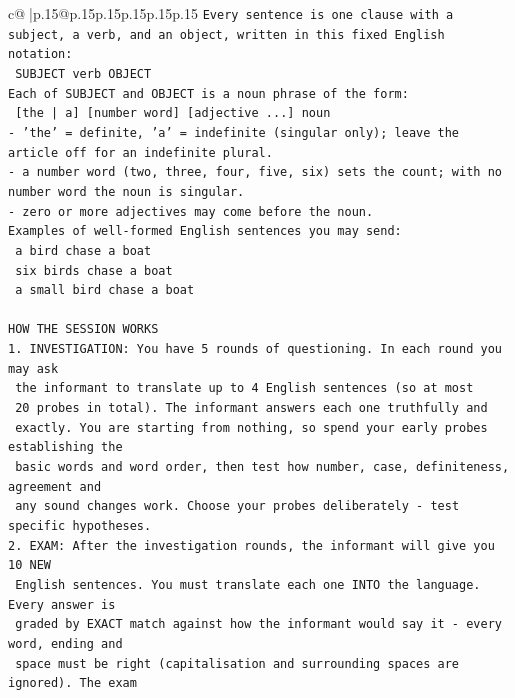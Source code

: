 \documentclass{article}
\begin{document}
{\begin{supertabular}{c@{$\;$}|p{.15\linewidth}@{}p{.15\linewidth}p{.15\linewidth}p{.15\linewidth}p{.15\linewidth}p{.15\linewidth}}
{{{\texttt{Every sentence is one clause with a subject, a verb, and an object, written in this fixed English notation:} \\
\texttt{    SUBJECT  verb  OBJECT} \\
\texttt{Each of SUBJECT and OBJECT is a noun phrase of the form:} \\
\texttt{    {[}the | a{]}  {[}number word{]}  {[}adjective ...{]}  noun} \\
\texttt{{-} 'the' = definite, 'a' = indefinite (singular only); leave the article off for an indefinite plural.} \\
\texttt{{-} a number word (two, three, four, five, six) sets the count; with no number word the noun is singular.} \\
\texttt{{-} zero or more adjectives may come before the noun.} \\
\texttt{Examples of well{-}formed English sentences you may send:} \\
\texttt{    a bird chase a boat} \\
\texttt{    six birds chase a boat} \\
\texttt{    a small bird chase a boat} \\
\\ 
\texttt{HOW THE SESSION WORKS} \\
\texttt{1. INVESTIGATION: You have 5 rounds of questioning. In each round you may ask} \\
\texttt{   the informant to translate up to 4 English sentences (so at most} \\
\texttt{   20 probes in total). The informant answers each one truthfully and} \\
\texttt{   exactly. You are starting from nothing, so spend your early probes establishing the} \\
\texttt{   basic words and word order, then test how number, case, definiteness, agreement and} \\
\texttt{   any sound changes work. Choose your probes deliberately {-} test specific hypotheses.} \\
\texttt{2. EXAM: After the investigation rounds, the informant will give you 10 NEW} \\
\texttt{   English sentences. You must translate each one INTO the language. Every answer is} \\
\texttt{   graded by EXACT match against how the informant would say it {-} every word, ending and} \\
\texttt{   space must be right (capitalisation and surrounding spaces are ignored). The exam} \\
}}}
\end{supertabular}}
\end{document}
